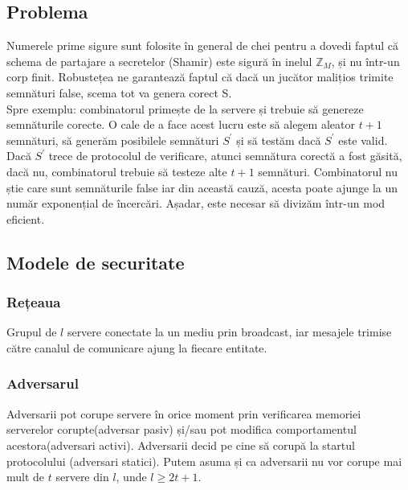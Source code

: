 \documentclass[12]{report}
\begin{document}
\subsection{Problema}
Numerele prime sigure sunt folosite în general de chei pentru a dovedi faptul că schema de partajare a secretelor (Shamir) este sigură în inelul $\mathbb{Z}_M$, și nu într-un corp finit. Robustețea ne garantează faptul că dacă un jucător malițios trimite semnături false, scema tot va genera corect S. \\
Spre exemplu: combinatorul primește de la servere și trebuie să genereze semnăturile corecte. O cale de a face acest lucru este să alegem aleator $t+1$ semnături, să generăm posibilele semnături $S^{'}$ și să testăm dacă $S^{'}$ este valid. Dacă $S^{'}$ trece de protocolul de verificare, atunci semnătura corectă a fost găsită, dacă nu, combinatorul trebuie să testeze alte $t+1$ semnături. Combinatorul nu știe care sunt semnăturile false iar din această cauză, acesta poate ajunge la un număr exponențial de încercări. Așadar, este necesar să divizăm într-un mod eficient.


\subsection{Modele de securitate}
\subsubsection{Rețeaua}
Grupul de $l$ servere conectate la un mediu prin broadcast, iar mesajele trimise către canalul de comunicare ajung la fiecare entitate.
\subsubsection{Adversarul}
Adversarii pot corupe servere în orice moment prin verificarea memoriei serverelor corupte(adversar pasiv) și/sau pot modifica comportamentul acestora(adversari activi). Adversarii decid pe cine să corupă la startul protocolului (adversari statici). Putem asuma și ca adversarii nu vor corupe mai mult de $t$ servere din $l$, unde $l \geqslant 2t+1$.
\end{document}
